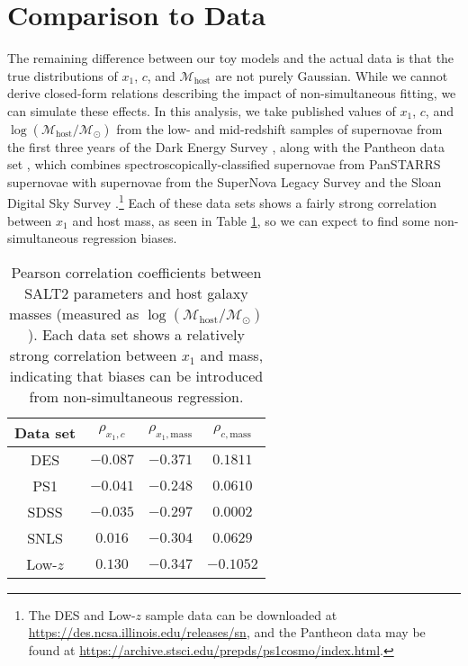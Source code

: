 \section{Comparison to Data}
\label{sec:data_comparison}
The remaining difference between our toy models and the actual data is that the true distributions of $x_1$, $c$, and $\mathcal{M}_\text{host}$ are not purely Gaussian. While we cannot derive closed-form relations describing the impact of non-simultaneous fitting, we can simulate these effects. In this analysis, we take published values of $x_1$, $c$, and $\log(\mathcal{M}_\text{host}/\mathcal{M}_\odot)$ from the low- and mid-redshift samples of supernovae from the first three years of the Dark Energy Survey \cite[][hereafter referred to as the Low-$z$ and DES subsamples]{abbott_first_2019}, along with the Pantheon data set \citep{scolnic_complete_2018}, which combines spectroscopically-classified supernovae from PanSTARRS supernovae \cite[PS1;][]{rest_cosmological_2014, scolnic_color_2014} with supernovae from the SuperNova Legacy Survey \cite[SNLS;][]{conley_supernova_2011, sullivan_snls3_2011} and the Sloan Digital Sky Survey \cite[SDSS;][]{frieman_sloan_2008, kessler_first-year_2009, sako_data_2018}.\footnote{The DES and Low-$z$ sample data can be downloaded at \url{https://des.ncsa.illinois.edu/releases/sn}, and the Pantheon data may be found at \url{https://archive.stsci.edu/prepds/ps1cosmo/index.html}.} Each of these data sets shows a fairly strong correlation between $x_1$ and host mass, as seen in Table \ref{tab:corr_coefs}, so we can expect to find some non-simultaneous regression biases.

\begin{table}[htbp]
    \centering
    \begin{tabular}{cccc}\toprule
        Data set & $\rho_{x_1, c}$ & $\rho_{x_1, \text{mass}}$ & $\rho_{c, \text{mass}}$\\\midrule
        DES & $-0.087$ & $-0.371$ & $0.1811$\\
        PS1 & $-0.041$ & $-0.248$ & $0.0610$\\
        SDSS & $-0.035$ & $-0.297$ & $0.0002$\\
        SNLS & $0.016$ & $-0.304$ & $0.0629$\\
        Low-$z$ & $0.130$ & $-0.347$ & $-0.1052$\\
        \bottomrule
    \end{tabular}
    \caption{Pearson correlation coefficients between SALT2 parameters and host galaxy masses (measured as $\log(\mathcal{M}_\text{host}/\mathcal{M}_\odot)$). Each data set shows a relatively strong correlation between $x_1$ and mass, indicating that biases can be introduced from non-simultaneous regression.}
    \label{tab:corr_coefs}
\end{table}

